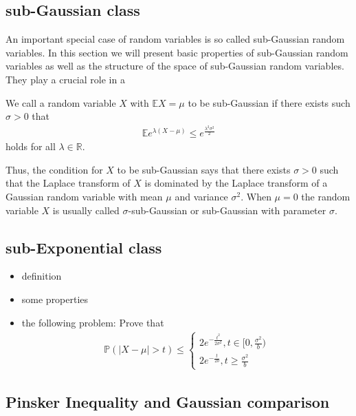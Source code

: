 \subsection{sub-Gaussian class}
An important special case of random variables is so called sub-Gaussian random variables. In this section we will present basic properties of sub-Gaussian random variables as well as the structure of the space of sub-Gaussian random variables. 
They play a crucial role in a  

\begin{dfn}
We call a random variable $X$ with $\mathbb{E} X = \mu$ to be sub-Gaussian if there exists such $\sigma > 0$ that 
\begin{align}
    \mathbb{E} e^{\lambda(X - \mu)} \le e^{\frac{\lambda^2 \sigma^2}{2}}
\end{align}
holds for all $\lambda \in \mathbb{R}$. 
\par Thus, the condition for $X$ to be sub-Gaussian says that there exists $\sigma > 0$ such that the Laplace transform of $X$ is dominated by the Laplace transform of a Gaussian random variable with mean $\mu$ and variance $\sigma^2$. When $\mu = 0$ the random variable $X$ is usually called $\sigma$-sub-Gaussian or sub-Gaussian with parameter $\sigma$. \end{dfn}

\subsection{sub-Exponential class}
\begin{itemize}
    \item definition 
    \item some properties 
    \item the following problem: Prove that 
    \begin{align}
        \mathbb{P}(|X - \mu| > t) \le \begin{cases} 2e^{-\frac{t^2}{2\sigma^2}}, t \in [0, \frac{\sigma^2}{b}) \\ 2e^{-\frac{t}{2b}}, t \ge \frac{\sigma^2}{b}\end{cases}
    \end{align}
\end{itemize}
\subsection{Pinsker Inequality and Gaussian comparison}